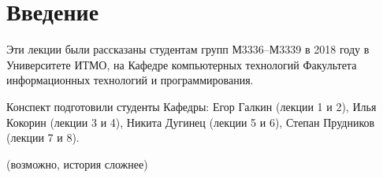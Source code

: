 \section{Введение}

Эти лекции были рассказаны студентам групп М3336--М3339 
в 2018 году в Университете ИТМО, на Кафедре компьютерных технологий Факультета информационных технологий и программирования.

Конспект подготовили студенты Кафедры: Егор Галкин (лекции 1 и 2),
Илья Кокорин (лекции 3 и 4), Никита Дугинец (лекции 5 и 6), Степан Прудников (лекции 7 и 8).

(возможно, история сложнее)